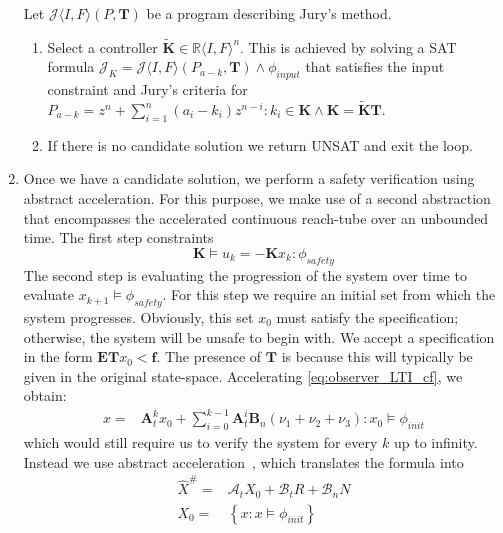 \documentclass[runningheads,a4paper]{llncs}
\newcommand{\mat}[1]{\boldsymbol{#1}}
\begin{document}
\begin{enumerate}
Let $\mathcal{J}\langle I,F \rangle (P,\mat{T})$ be a program describing Jury's method.
\begin{enumerate}
\item Select a controller $\tilde{\mat{K}} \in \mathbb{R}\langle I,F\rangle^n$. This is achieved by solving a SAT formula $\mathcal{J}_K=\mathcal{J}\langle I,F \rangle (P_{a-k},\mat{T})\wedge \phi_{input}$ that satisfies the input constraint and Jury's criteria for $P_{a-k}=z^n+\sum_{i=1}^n (a_i-k_i) z^{n-i} : k_i \in \mat{K} \wedge \mat{K}=\tilde{\mat{K}}\mat{T}$.
\item If there is no candidate solution we return UNSAT and exit the loop.
\end{enumerate}
\item Once we have a candidate solution, we perform a safety verification using abstract acceleration. For this purpose, we make use of a second abstraction that encompasses the accelerated continuous reach-tube over an unbounded time. %
%
The first step constraints
\begin{equation}
\mat{K} \models u_k=-\mat{K}x_k : \phi_{safety}
\label{eq:of_bounds}
\end{equation}
The second step is evaluating the progression of the system over time to evaluate 
$x_{k+1} \models \phi_{safety}$. For this step we require 
an initial set from which the system progresses. Obviously, this set $x_0$ 
must satisfy the specification; otherwise, the system will be unsafe to begin with.
We accept a specification in the form $\mat{E}\mat{T}x_0<\mat{f}$. 
The presence of $\mat{T}$ is because this will typically be given in the original 
state-space. Accelerating \eqref{eq:observer_LTI_cf}, we obtain:
%
\begin{align}
\label{eq:acc_observer_LTI_cf}
x=&\mat{A}_t^kx_0
+\sum_{i=0}^{k-1} \mat{A}_t^i \mat{B}_{n}(\nu_1+\nu_2+\nu_3) : x_0 \models \phi_{init}
\end{align}
which would still require us to verify the system for every $k$ up to infinity. 
Instead we use abstract acceleration~\cite{cattaruzza2015unbounded}, which translates the formula into
%
\begin{align}
\label{eq:aa_observer_LTI_cf}
\hat{X}^\#
=&\mathcal{A}_t X_0+\mathcal{B}_{t} R + \mathcal{B}_{n} N\\
X_0 =&\left \{x : x \models \phi_{init} \right\}\nonumber\\

\end{align}
\end{enumerate}
\end{document}
